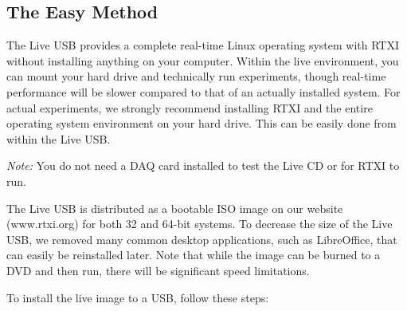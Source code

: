 
\subsection{The Easy Method}
\label{easyinstall}

The Live USB provides a complete real-time Linux operating system with RTXI without installing anything on your computer. Within the live environment, you can mount your hard drive and technically run experiments, though real-time performance will be slower compared to that of an actually installed system. For actual experiments, we strongly recommend installing RTXI and the entire operating system environment on your hard drive. This can be easily done from within the Live USB. 

\textit{Note:} You do not need a DAQ card installed to test the Live CD or for RTXI to run.

The Live USB is distributed as a bootable ISO image on our website (www.rtxi.org) for both 32 and 64-bit systems. To decrease the size of the Live USB, we removed many  common desktop applications, such as LibreOffice, that can easily be reinstalled later. Note that while the image can be burned to a DVD and then run, there will be significant speed limitations. 

To install the live image to a USB, follow these steps:

